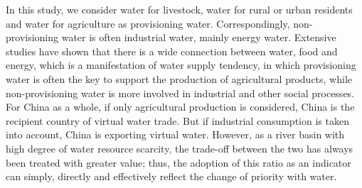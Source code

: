 \documentclass[9pt,twoside,lineno]{pnas-new}
\begin{document}
    In this study, we consider water for livestock, water for rural or urban residents and water for agriculture as provisioning water. Correspondingly, non-provisioning water is often industrial water, mainly energy water. Extensive studies have shown that there is a wide connection between water, food and energy, which is a manifestation of water supply tendency, in which provisioning water is often the key to support the production of agricultural products, while non-provisioning water is more involved in industrial and other social processes. For China as a whole, if only agricultural production is considered, China is the recipient country of virtual water trade. But if industrial consumption is taken into account, China is exporting virtual water. However, as a river basin with high degree of water resource scarcity, the trade-off between the two has always been treated with greater value; thus, the adoption of this ratio as an indicator can simply, directly and effectively reflect the change of priority with water.
\end{document}

